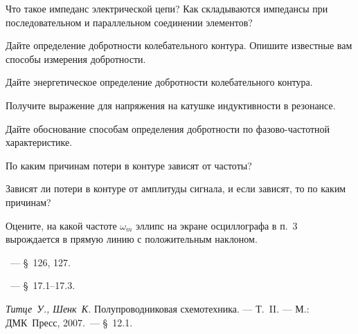 \begin{lab:questions}
    \item Что такое импеданс электрической цепи?
    Как складываются импедансы при последовательном и параллельном
    соединении элементов?
    
    \item Дайте определение добротности колебательного контура.
    Опишите известные вам способы измерения добротности.
    
    \item Дайте энергетическое определение добротности колебательного контура.

    \item  Получите выражение для напряжения на катушке индуктивности  в
резонансе.

    \item Дайте обоснование способам определения добротности по
фазово-частотной характеристике.

    \item По каким причинам потери в контуре зависят от частоты?

    \item *Зависят ли потери в контуре от амплитуды сигнала, и если зависят, то
по каким причинам?

    \item *Оцените, на какой частоте $\omega_m$ эллипс на экране осциллографа в
п.~3 вырождается в прямую линию с положительным наклоном.
\end{lab:questions}


\begin{lab:literature}
        \item \SivuhinIII~--- \S~126, 127.
        \item \Kirichenko~--- \S~17.1--17.3.
    \item *\emph{Титце~У., Шенк~К.} Полупроводниковая схемотехника.  --- Т.~II. ---
М.: ДМК~Пресс, 2007.~--- \S~12.1.
\end{lab:literature}

